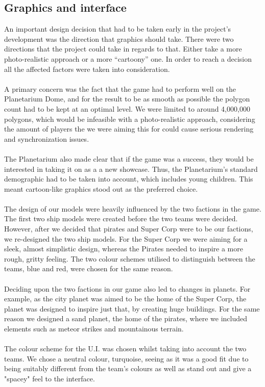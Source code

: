 \documentclass[11pt,a4paper]{article}
\begin{document}
       \subsection{Graphics and interface}

       \noindent
        An important design decision that had to be taken early in the project's development was the direction that graphics should take. There were two directions that the project could take in regards to that. Either take a more photo-realistic approach or a more “cartoony” one. In order to reach a decision all the affected factors were taken into consideration. \\ \\A primary concern was the fact that the game had to perform well on the Planetarium Dome, and for the result to be as smooth as possible the polygon count had to be kept at an optimal level. We were limited to around 4,000,000 polygons, which would be infeasible with a photo-realistic approach, considering the amount of players the we were aiming this for could cause serious rendering and synchronization issues. \\ \\
        \noindent
        The Planetarium also made clear that if the game was a success, they would be interested in taking it on as a a new showcase. Thus, the Planetarium’s standard demographic had to be taken into account, which includes young children. This meant cartoon-like graphics stood out as the preferred choice.  \\ \\
\noindent
        The design of our models were heavily influenced by the two factions in the game. The first two ship models were created before the two teams were decided. However, after we decided that pirates and Super Corp were to be our factions, we re-designed the two ship models. For the Super Corp we were aiming for a sleek, almost simplistic design, whereas the Pirates needed to inspire a more rough, gritty feeling. The two colour schemes utilised to distinguish between the teams, blue and red, were chosen for the same reason. \\ \\
\noindent
        Deciding upon the two factions in our game also led to changes in planets. For example, as the city planet was aimed to be the home of the Super Corp, the planet was designed to inspire just that, by creating huge buildings. For the same reason we designed a sand planet, the home of the pirates, where we included elements such as meteor strikes and mountainous terrain. \\ \\
\noindent
        The colour scheme for the U.I. was chosen whilst taking into account the two teams. We chose a neutral colour, turquoise, seeing as it was a good fit due to being suitably different from the team's colours as well as stand out and give a "spacey" feel to the interface. \\ \\
\end{document}
